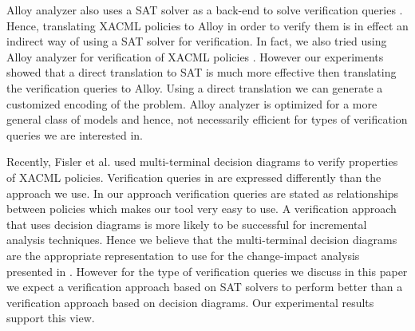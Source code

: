 Alloy analyzer also uses a SAT solver as a back-end to solve verification
queries \cite{jackson00automating,jackson:alcoa}. 
Hence, translating XACML policies to Alloy in order to verify them
is in effect an indirect way of using a SAT solver for verification.
In fact, we also tried using Alloy analyzer for verification of XACML policies \cite{hughes04}.
However our experiments showed that a direct
translation to SAT is much more effective then translating
the verification queries to Alloy. 
Using a direct translation we can generate a customized encoding 
of the problem. Alloy analyzer is optimized for a more general class
of models and hence, not necessarily efficient for types of verification
queries we are interested in.

Recently, Fisler et al. \cite{fisler05} used multi-terminal decision
diagrams to verify properties of XACML policies. Verification
queries in \cite{fisler05} are expressed differently than the approach we use.
In our approach verification queries are stated as relationships between
policies which makes our tool very easy to use. 
A verification approach that uses decision diagrams is more likely to be
successful for incremental analysis techniques. Hence we believe that
the multi-terminal decision
diagrams are the appropriate representation to use for the change-impact analysis
presented in \cite{fisler05}. 
However for the type of verification queries we discuss in this paper we expect a verification
approach based on SAT solvers to
perform better than a verification approach based on decision diagrams. 
Our experimental results support this view.
